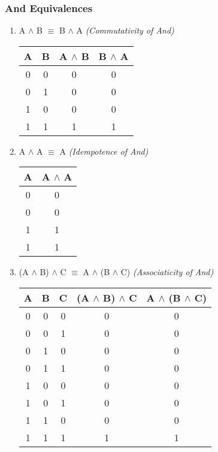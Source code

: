 \documentclass[11pt]{article}
\begin{document}
\subsubsection{And Equivalences}
\begin{enumerate}
  \item A $\land$ B $\equiv$ B $\land$ A \emph{(Commutativity of And)}

\begin{center}
  \begin{tabular}{| c | c | c | c |}
    \hline
    A & B & A $\land$ B & B $\land$ A \\ \hline
    0 & 0 & 0 & 0 \\
    0 & 1 & 0 & 0 \\
    1 & 0 & 0 & 0 \\
    1 & 1 & 1 & 1 \\ \hline
  \end{tabular}
\end{center}

  \item A $\land$ A $\equiv$ A \emph{(Idempotence of And)}

\begin{center}
  \begin{tabular}{| c | c |}
    \hline
    A & A $\land$ A \\ \hline
    0 & 0 \\
    0 & 0 \\
    1 & 1 \\
    1 & 1 \\ \hline
  \end{tabular}
\end{center}

  \item (A $\land$ B) $\land$ C $\equiv$ A $\land$ (B $\land$ C) \emph{(Associaticity of And)}

\begin{center}
  \begin{tabular}{| c | c | c | c | c |}
    \hline
    A & B & C & (A $\land$ B) $\land$ C & A $\land$ (B $\land$ C) \\ \hline
    0 & 0 & 0 & 0 & 0 \\
    0 & 0 & 1 & 0 & 0 \\
    0 & 1 & 0 & 0 & 0 \\
    0 & 1 & 1 & 0 & 0 \\
    1 & 0 & 0 & 0 & 0 \\
    1 & 0 & 1 & 0 & 0 \\
    1 & 1 & 0 & 0 & 0 \\
    1 & 1 & 1 & 1 & 1 \\ \hline
  \end{tabular}
\end{center}
\end{enumerate}
\end{document}

